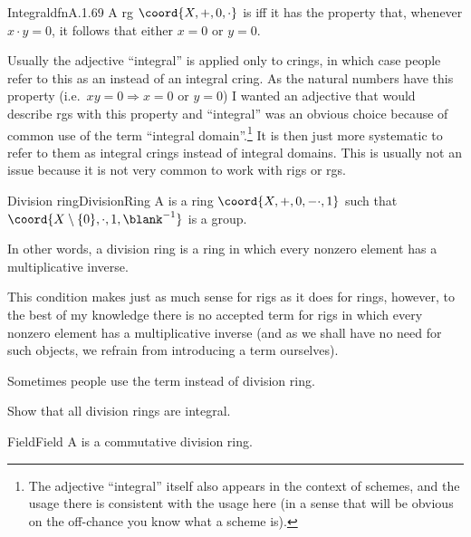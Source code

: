\begin{dfn}{Integral}{dfnA.1.69}
A rg $\coord{X,+,0,\cdot}$ is  iff it has the property that, whenever $x\cdot y=0$, it follows that either $x=0$ or $y=0$.
\begin{rmk}
Usually the adjective ``integral'' is applied only to crings, in which case people refer to this as an  instead of an integral cring.  As the natural numbers have this property (i.e.~$xy=0\Rightarrow x=0\text{ or }y=0$) I wanted an adjective that would describe rgs with this property and ``integral'' was an obvious choice because of common use of the term ``integral domain''.\footnote{The adjective ``integral'' itself also appears in the context of schemes, and the usage there is consistent with the usage here (in a sense that will be obvious on the off-chance you know what a scheme is).}  It is then just more systematic to refer to them as integral crings instead of integral domains.  This is usually not an issue because it is not very common to work with rigs or rgs.
\end{rmk}
\end{dfn}
\begin{dfn}{Division ring}{DivisionRing}
	A  is a ring $\coord{X,+,0,-\cdot ,1}$ such that $\coord{X\setminus \{ 0\} ,\cdot ,1,\blank ^{-1}}$ is a group.
	\begin{rmk}
		In other words, a division ring is a ring in which every nonzero element has a multiplicative inverse.
	\end{rmk}
	\begin{rmk}
		This condition makes just as much sense for rigs as it does for rings, however, to the best of my knowledge there is no accepted term for rigs in which every nonzero element has a multiplicative inverse (and as we shall have no need for such objects, we refrain from introducing a term ourselves).
	\end{rmk}
	\begin{rmk}
		Sometimes people use the term  instead of division ring.
	\end{rmk}
\end{dfn}
\begin{exr}{}{}
Show that all division rings are integral.
\end{exr}
\begin{dfn}{Field}{Field}
A  is a commutative division ring.
\end{dfn}
